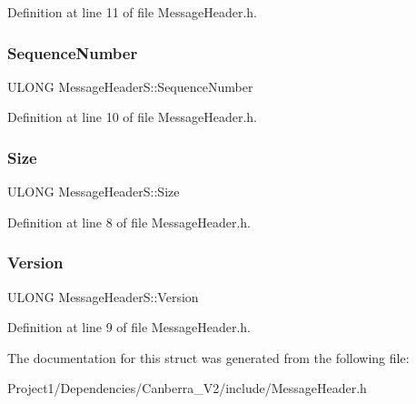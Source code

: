 Definition at line 11 of file Message\+Header.\+h.

\mbox{\label{struct_message_header_s_abea32cb680a03f167f06cd234602923d}} 
\subsubsection{\texorpdfstring{Sequence\+Number}{SequenceNumber}}
{\footnotesize\ttfamily U\+L\+O\+NG Message\+Header\+S\+::\+Sequence\+Number}



Definition at line 10 of file Message\+Header.\+h.

\mbox{\label{struct_message_header_s_aadf726500ef4da91aade01e7ce77f1b6}} 
\subsubsection{\texorpdfstring{Size}{Size}}
{\footnotesize\ttfamily U\+L\+O\+NG Message\+Header\+S\+::\+Size}



Definition at line 8 of file Message\+Header.\+h.

\mbox{\label{struct_message_header_s_ad84ac3fe8c24c33ed7bedf9f0799d171}} 
\subsubsection{\texorpdfstring{Version}{Version}}
{\footnotesize\ttfamily U\+L\+O\+NG Message\+Header\+S\+::\+Version}



Definition at line 9 of file Message\+Header.\+h.



The documentation for this struct was generated from the following file\+:\begin{DoxyCompactItemize}
\item 
Project1/\+Dependencies/\+Canberra\+\_\+\+V2/include/Message\+Header.\+h\end{DoxyCompactItemize}
